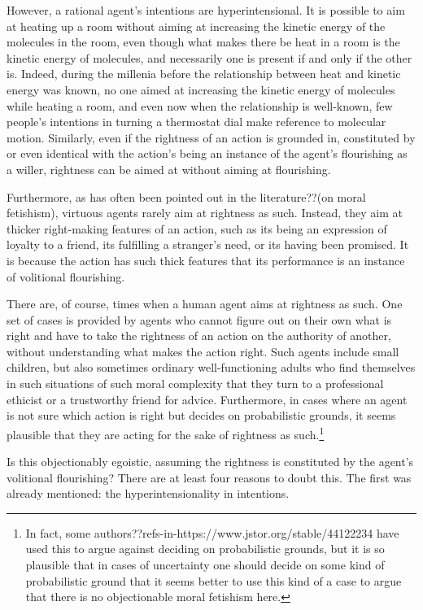 However, a rational agent's intentions are hyperintensional. It is possible to aim at heating up a room without aiming
at increasing the kinetic energy of the molecules in the room, even though what makes there be heat in a room is the
kinetic energy of molecules, and necessarily one is present if and only if the other is. Indeed, during the millenia 
before the relationship between heat and kinetic energy was known, no one aimed at increasing the kinetic energy of 
molecules while heating a room, and even now when the relationship is well-known, few people's intentions in turning 
a thermostat dial make reference to molecular motion. Similarly, even if the rightness of an action is grounded in, constituted 
by or even identical with the action's being an instance of the agent's flourishing as a willer, rightness can be 
aimed at without aiming at flourishing.

Furthermore, as has often been pointed out in the literature??(on moral fetishism), virtuous agents rarely aim at 
rightness as such. Instead, they aim at thicker right-making features of an action, such as its being an expression
of loyalty to a friend, its fulfilling a stranger's need, or its having been promised. It is because the action has
such thick features that its performance is an instance of volitional flourishing. 

There are, of course, times when a human agent aims at rightness as such. One set of cases is provided by agents who cannot
figure out on their own what is right and have to take the rightness of an action on the authority of another, without
understanding what makes the action right. Such agents include small children, but also sometimes ordinary well-functioning
adults who find themselves in such situations of such moral complexity that they turn to a professional ethicist or a 
trustworthy friend for advice. Furthermore, in cases where an agent is not sure which action is right but decides on
probabilistic grounds, it seems plausible that they are acting for the sake of rightness as such.\footnote{In fact, some
authors??refs-in-https://www.jstor.org/stable/44122234 have used this to argue against deciding on probabilistic grounds,
but it is  so plausible that in cases of uncertainty one should decide on some kind of probabilistic ground that it seems
better to use this kind of a case to argue that there is no objectionable moral fetishism here.}

Is this objectionably egoistic, assuming the rightness is constituted by the agent's volitional
flourishing? There are at least four reasons to doubt this. The first was already mentioned: the hyperintensionality in 
intentions.

